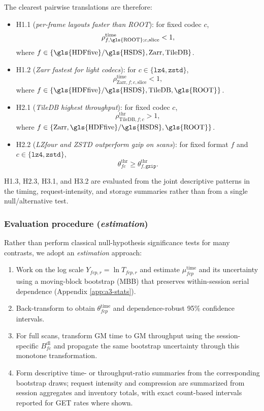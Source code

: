 \documentclass[nomenclature, english, bibtex]{kththesis}
\numberwithin{listing}{chapter}
\begin{document}
The clearest pairwise translations are therefore:
\begin{itemize}
  \item H1.1 (\emph{per-frame layouts faster than \gls{ROOT}}): for fixed codec $c$,
  \[
    \rho^{\mathrm{time}}_{f,\text{\gls{ROOT}};c,\text{slice}} < 1,
  \]
  where $f\in\{\text{\gls{HDFfive}/\gls{HSDS}},\text{Zarr},\text{TileDB}\}$.

  \item H1.2 (\emph{Zarr fastest for light codecs}): for $c\in\{\texttt{lz4},\texttt{zstd}\}$,
  \[
    \rho^{\mathrm{time}}_{\text{Zarr},f;c,\text{slice}} < 1,
  \]
  where $f\in\{\text{\gls{HDFfive}/\gls{HSDS}},\text{TileDB},\text{\gls{ROOT}}\}$.

  \item H2.1 (\emph{TileDB highest throughput}): for fixed codec $c$,
  \[
    \rho^{\mathrm{thr}}_{\text{TileDB},f;c} > 1,
  \]
  where $f\in\{\text{Zarr},\text{\gls{HDFfive}/\gls{HSDS}},\text{\gls{ROOT}}\}$.

  \item H2.2 (\emph{\gls{LZfour} and \gls{ZSTD} outperform gzip on scans}): for fixed format $f$ and $c\in\{\texttt{lz4},\texttt{zstd}\}$,
  \[
    \theta^{\mathrm{thr}}_{fc} \ge \theta^{\mathrm{thr}}_{f,\texttt{gzip}}.
  \]
\end{itemize}

H1.3, H2.3, H3.1, and H3.2 are evaluated from the joint descriptive patterns in the timing, request-intensity, and storage summaries rather than from a single null/alternative test.

\subsubsection{Evaluation procedure (\emph{estimation})}
Rather than perform classical null-hypothesis significance tests for many contrasts, we adopt an \emph{estimation} approach:

\begin{enumerate}
  \item Work on the log scale $Y_{fcp,r}=\ln T_{fcp,r}$ and estimate $\mu^{\mathrm{time}}_{fcp}$ and its uncertainty using a moving-block bootstrap (\gls{MBB}) that preserves within-session serial dependence (Appendix \ref{app:a3-stats}).
  \item Back-transform to obtain $\theta^{\mathrm{time}}_{fcp}$ and dependence-robust 95\% confidence intervals.
  \item For full scans, transform \gls{GM} time to \gls{GM} throughput using the session-specific $B^{\mathrm{dl}}_{fc}$ and propagate the same bootstrap uncertainty through this monotone transformation.
  \item Form descriptive time- or throughput-ratio summaries from the corresponding bootstrap draws; request intensity and compression are summarized from session aggregates and inventory totals, with exact count-based intervals reported for GET rates where shown.
\end{enumerate}
\end{document}

